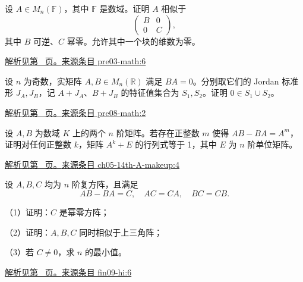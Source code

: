 \documentclass[UTF8,12pt,a4paper,fontset=fandol]{ctexart}
\begin{document}
\begin{example}\label{ex:pre03-math:6}

设 $A\in M_n(\mathbb F)$，其中 $\mathbb F$ 是数域。证明 $A$ 相似于
\[
\begin{pmatrix}B&0\\0&C\end{pmatrix},
\]
其中 $B$ 可逆、$C$ 幂零。允许其中一个块的维数为零。

\par\hyperref[ans:pre03-math:6]{解析见第~\pageref{ans:pre03-math:6} 页。}\quad\href{https://github.com/lzxcr/cmc-mathematics/blob/64916fa1fdbc3e444a652eca204d5669058ee321/src/problems/preliminary/03/06.md}{来源条目 pre03-math:6}

\end{example}

\begin{example}\label{ex:pre08-math:2}

设 $n$ 为奇数，实矩阵 $A,B\in M_n(\mathbb R)$ 满足 $BA=0$。分别取它们的 Jordan 标准形 $J_A,J_B$，记 $A+J_A$、$B+J_B$ 的特征值集合为 $S_1,S_2$。证明 $0\in S_1\cup S_2$。

\par\hyperref[ans:pre08-math:2]{解析见第~\pageref{ans:pre08-math:2} 页。}\quad\href{https://github.com/lzxcr/cmc-mathematics/blob/64916fa1fdbc3e444a652eca204d5669058ee321/src/problems/preliminary/08/02.md}{来源条目 pre08-math:2}

\end{example}

\begin{example}\label{ex:ch05-14th-A-makeup:4}

设 $A,B$ 为数域 $K$ 上的两个 $n$ 阶矩阵。若存在正整数 $m$ 使得 $AB-BA=A^m$，证明对任何正整数 $k$，矩阵 $A^k+E$ 的行列式等于 1，其中 $E$ 为 $n$ 阶单位矩阵。

\par\hyperref[ans:ch05-14th-A-makeup:4]{解析见第~\pageref{ans:ch05-14th-A-makeup:4} 页。}\quad\href{https://github.com/lzxcr/cmc-mathematics/blob/64916fa1fdbc3e444a652eca204d5669058ee321/src/problems/preliminary/14-makeup/04.md}{来源条目 ch05-14th-A-makeup:4}

\end{example}

\begin{example}\label{ex:fin09-hi:6}

设 $A, B, C$ 均为 $n$ 阶复方阵，且满足
\[
AB - BA = C, \quad AC = CA, \quad BC = CB.
\]

（1）证明：$C$ 是幂零方阵；

（2）证明：$A, B, C$ 同时相似于上三角阵；

（3）若 $C \neq 0$，求 $n$ 的最小值。

\par\hyperref[ans:fin09-hi:6]{解析见第~\pageref{ans:fin09-hi:6} 页。}\quad\href{https://github.com/lzxcr/cmc-mathematics/blob/64916fa1fdbc3e444a652eca204d5669058ee321/src/problems/finals/09/06.md}{来源条目 fin09-hi:6}

\end{example}
\end{document}
